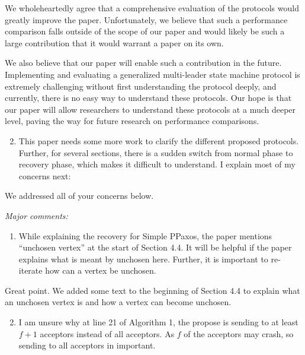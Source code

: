 \documentclass[letterpaper,twocolumn,10pt]{article}
\newenvironment{reviewerquote}
{\list{}{\leftmargin=\parindent\rightmargin=0in}\item[] \itshape \color{ReviewerDarkGray}}%
{\endlist}
\begin{document}
We wholeheartedly agree that a comprehensive evaluation of the protocols would
greatly improve the paper. Unfortunately, we believe that such a performance
comparison falls outside of the scope of our paper and would likely be such a
large contribution that it would warrant a paper on its own.

We also believe that our paper will enable such a contribution in the future.
Implementing and evaluating a generalized multi-leader state machine protocol
is extremely challenging without first understanding the protocol deeply, and
currently, there is no easy way to understand these protocols. Our hope is that
our paper will allow researchers to understand these protocols at a much deeper
level, paving the way for future research on performance comparisons.

\begin{reviewerquote}
  \begin{enumerate}
    \setcounter{enumi}{1}
    \item
      This paper needs some more work to clarify the different proposed
      protocols. Further, for several sections, there is a sudden switch from
      normal phase to recovery phase, which makes it difficult to understand. I
      explain most of my concerns next:
  \end{enumerate}
\end{reviewerquote}

We addressed all of your concerns below.

\begin{reviewerquote}
  Major comments:

  \begin{enumerate}
    \setcounter{enumi}{0}
    \item
      While explaining the recovery for Simple PPaxos, the paper mentions
      ``unchosen vertex'' at the start of Section 4.4. It will be helpful if
      the paper explains what is meant by unchosen here. Further, it is
      important to re-iterate how can a vertex be unchosen.
  \end{enumerate}
\end{reviewerquote}

Great point. We added some text to the beginning of Section 4.4 to explain what
an unchosen vertex is and how a vertex can become unchosen.

\begin{reviewerquote}
  \begin{enumerate}
    \setcounter{enumi}{1}
    \item
      I am unsure why at line 21 of Algorithm 1, the propose is sending to at
      least $f+1$ acceptors instead of all acceptors. As $f$ of the acceptors
      may crash, so sending to all acceptors in important.
  \end{enumerate}
\end{reviewerquote}
\end{document}
